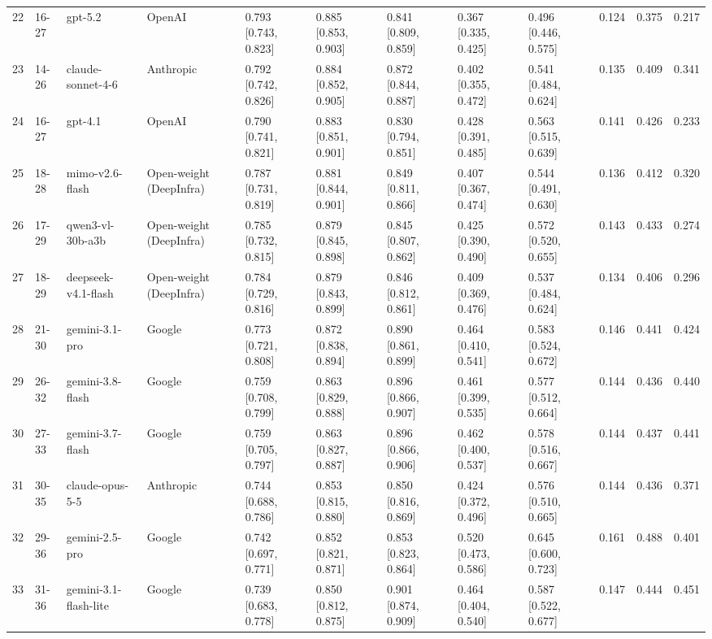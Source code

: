 \begin{table}
\begin{tabular}{rllllllllrrr}
22 & 16-27 & gpt-5.2 & OpenAI & 0.793 [0.743, 0.823] & 0.885 [0.853, 0.903] & 0.841 [0.809, 0.859] & 0.367 [0.335, 0.425] & 0.496 [0.446, 0.575] & 0.124 & 0.375 & 0.217 \\
23 & 14-26 & claude-sonnet-4-6 & Anthropic & 0.792 [0.742, 0.826] & 0.884 [0.852, 0.905] & 0.872 [0.844, 0.887] & 0.402 [0.355, 0.472] & 0.541 [0.484, 0.624] & 0.135 & 0.409 & 0.341 \\
24 & 16-27 & gpt-4.1 & OpenAI & 0.790 [0.741, 0.821] & 0.883 [0.851, 0.901] & 0.830 [0.794, 0.851] & 0.428 [0.391, 0.485] & 0.563 [0.515, 0.639] & 0.141 & 0.426 & 0.233 \\
25 & 18-28 & mimo-v2.6-flash & Open-weight (DeepInfra) & 0.787 [0.731, 0.819] & 0.881 [0.844, 0.901] & 0.849 [0.811, 0.866] & 0.407 [0.367, 0.474] & 0.544 [0.491, 0.630] & 0.136 & 0.412 & 0.320 \\
26 & 17-29 & qwen3-vl-30b-a3b & Open-weight (DeepInfra) & 0.785 [0.732, 0.815] & 0.879 [0.845, 0.898] & 0.845 [0.807, 0.862] & 0.425 [0.390, 0.490] & 0.572 [0.520, 0.655] & 0.143 & 0.433 & 0.274 \\
27 & 18-29 & deepseek-v4.1-flash & Open-weight (DeepInfra) & 0.784 [0.729, 0.816] & 0.879 [0.843, 0.899] & 0.846 [0.812, 0.861] & 0.409 [0.369, 0.476] & 0.537 [0.484, 0.624] & 0.134 & 0.406 & 0.296 \\
28 & 21-30 & gemini-3.1-pro & Google & 0.773 [0.721, 0.808] & 0.872 [0.838, 0.894] & 0.890 [0.861, 0.899] & 0.464 [0.410, 0.541] & 0.583 [0.524, 0.672] & 0.146 & 0.441 & 0.424 \\
29 & 26-32 & gemini-3.8-flash & Google & 0.759 [0.708, 0.799] & 0.863 [0.829, 0.888] & 0.896 [0.866, 0.907] & 0.461 [0.399, 0.535] & 0.577 [0.512, 0.664] & 0.144 & 0.436 & 0.440 \\
30 & 27-33 & gemini-3.7-flash & Google & 0.759 [0.705, 0.797] & 0.863 [0.827, 0.887] & 0.896 [0.866, 0.906] & 0.462 [0.400, 0.537] & 0.578 [0.516, 0.667] & 0.144 & 0.437 & 0.441 \\
31 & 30-35 & claude-opus-5-5 & Anthropic & 0.744 [0.688, 0.786] & 0.853 [0.815, 0.880] & 0.850 [0.816, 0.869] & 0.424 [0.372, 0.496] & 0.576 [0.510, 0.665] & 0.144 & 0.436 & 0.371 \\
32 & 29-36 & gemini-2.5-pro & Google & 0.742 [0.697, 0.771] & 0.852 [0.821, 0.871] & 0.853 [0.823, 0.864] & 0.520 [0.473, 0.586] & 0.645 [0.600, 0.723] & 0.161 & 0.488 & 0.401 \\
33 & 31-36 & gemini-3.1-flash-lite & Google & 0.739 [0.683, 0.778] & 0.850 [0.812, 0.875] & 0.901 [0.874, 0.909] & 0.464 [0.404, 0.540] & 0.587 [0.522, 0.677] & 0.147 & 0.444 & 0.451 \\

\end{tabular}
\end{table}
